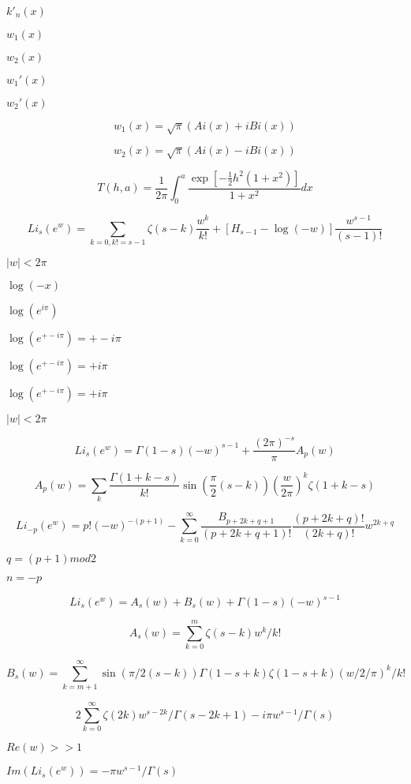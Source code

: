 \documentclass{article}
\begin{document}
$ k'_n(x) $
\pagebreak

$ w_1(x) $
\pagebreak

$ w_2(x) $
\pagebreak

$ w_1'(x) $
\pagebreak

$ w_2'(x) $
\pagebreak

\[ w_1(x) = \sqrt{\pi}(Ai(x) + iBi(x)) \]
\pagebreak

\[ w_2(x) = \sqrt{\pi}(Ai(x) - iBi(x)) \]
\pagebreak

\[ T(h,a) = \frac{1}{2\pi}\int_0^a\frac{\exp[-\frac{1}{2}h^2(1+x^2)]}{1+x^2}dx \]
\pagebreak

\[ Li_s(e^w) = \sum_{k=0, k != s-1} \zeta(s-k) \frac{w^k}{k!} + \left[H_{s-1} - \log(-w)\right] \frac{w^{s-1}}{(s-1)!} \]
\pagebreak

$ |w| < 2 \pi $
\pagebreak

$ \log(-x) $
\pagebreak

$ \log(e^{i\pi}) $
\pagebreak

$ \log(e^{+-i\pi}) = +-i\pi $
\pagebreak

$ \log(e^{+- i\pi}) = +i \pi $
\pagebreak

$ \log(e^{+- i\pi}) = +i\pi $
\pagebreak

$ |w| < 2\pi $
\pagebreak

\[ Li_s(e^w) = \Gamma(1-s)(-w)^{s-1} + \frac{(2\pi)^{-s}}{\pi} A_p(w) \]
\pagebreak

\[ A_p(w) = \sum_k \frac{\Gamma(1+k-s)}{k!} \sin\left(\frac{\pi}{2} (s-k)\right) \left(\frac{w}{2\pi}\right)^k \zeta(1+k-s) \]
\pagebreak

\[ Li_{-p}(e^w) = p!(-w)^{-(p+1)} - \sum_{k=0}^{\infty} \frac{B_{p+2k+q+1}}{(p+2k+q+1)!} \frac{(p+2k+q)!}{(2k+q)!}w^{2k+q} \]
\pagebreak

$ q = (p+1) mod 2 $
\pagebreak

$ n = -p $
\pagebreak

\[ Li_s(e^w) = A_s(w) + B_s(w) + \Gamma(1-s)(-w)^{s-1} \]
\pagebreak

\[ A_s(w) = \sum_{k=0}^{m} \zeta(s-k)w^k/k! \]
\pagebreak

\[ B_s(w) = \sum_{k=m+1}^{\infty} \sin(\pi/2(s-k)) \Gamma(1-s+k)\zeta(1-s+k) (w/2/\pi)^k/k! \]
\pagebreak

\[ 2 \sum_{k=0}^{\infty} \zeta(2k) w^{s-2k}/\Gamma(s-2k+1) -i \pi w^{s-1}/\Gamma(s) \]
\pagebreak

$ Re(w) >> 1 $
\pagebreak

$ Im(Li_s(e^w)) = -\pi w^{s-1}/\Gamma(s) $
\pagebreak
\end{document}
